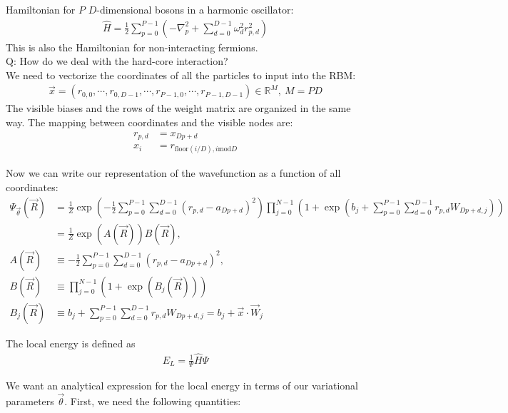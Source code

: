 \documentclass[12pt]{article}
\begin{document}
\noindent Hamiltonian for $P$ $D$-dimensional bosons in a harmonic oscillator:
\begin{align*}
\hat{H} = \frac{1}{2} \sum_{p = 0}^{P-1} \left( -\nabla_p^2 + \sum_{d=0}^{D-1} \omega_d^2 r_{p,d}^2 \right) 
\end{align*}
\noindent This is also the Hamiltonian for non-interacting fermions. \\
\noindent Q: How do we deal with the hard-core interaction?\\

\noindent We need to vectorize the coordinates of all the particles to input into the RBM:
\begin{align*}
\vec{x} = ( r_{0,0}, \cdots, r_{0,D-1}, \cdots, r_{P-1,0}, \cdots, r_{P-1,D-1} ) \in \mathbb{R}^M, \ M = PD
\end{align*}
\noindent The visible biases and the rows of the weight matrix are organized in the same way. The mapping between coordinates and the visible nodes are:
\begin{align*}
r_{p,d} &= x_{Dp+d}\\
x_i &= r_{\text{floor}(i/D), i \text{mod} D}
\end{align*}

\noindent Now we can write our representation of the wavefunction as a function of all coordinates:
\begin{align*}
\Psi_{\vec{\theta}}(\vec{R}) &=\frac{1}{Z} \exp \left( -\frac{1}{2} \sum_{p=0}^{P-1}\sum_{d=0}^{D-1} (r_{p,d} - a_{Dp+d})^2 \right) \prod_{j=0}^{N-1} \left( 1 + \exp \left( b_j + \sum_{p=0}^{P-1}\sum_{d=0}^{D-1} r_{p,d} W_{Dp+d,j} \right) \right)\\
&= \frac{1}{Z} \exp (A(\vec{R})) B(\vec{R}),\\
A(\vec{R}) &\equiv -\frac{1}{2} \sum_{p=0}^{P-1}\sum_{d=0}^{D-1} (r_{p,d} - a_{Dp+d})^2,\\
B(\vec{R}) &\equiv \prod_{j=0}^{N-1} \left( 1 + \exp \left( B_j(\vec{R}) \right) \right)\\
B_j(\vec{R}) &\equiv b_j + \sum_{p=0}^{P-1}\sum_{d=0}^{D-1} r_{p,d} W_{Dp+d,j} = b_j + \vec{x}\cdot \vec{W}_j
\end{align*}

\noindent The local energy is defined as
\begin{align*}
E_L = \frac{1}{\Psi} \hat{H} \Psi
\end{align*}

\noindent We want an analytical expression for the local energy in terms of our variational parameters $\vec{\theta}$. First, we need the following quantities:
\end{document}
